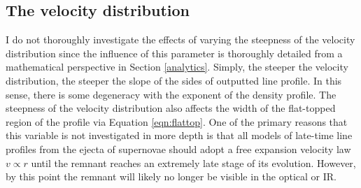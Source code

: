 %
%
%

\subsection{The velocity distribution}

\label{scn:vel_prof}

I do not thoroughly investigate the effects of varying the steepness of the velocity distribution since the influence of this parameter is thoroughly detailed from a mathematical perspective in Section \ref{analytics}.  Simply, the steeper the velocity distribution, the steeper the slope of the sides of outputted line profile.  In this sense, there is some degeneracy with the exponent of the density profile.  The steepness of the velocity distribution also affects the width of the flat-topped region of the profile via Equation \ref{eqn:flattop}.  One of the primary reasons that this variable is not investigated in more depth is that all models of late-time line profiles from the ejecta of supernovae should adopt a free expansion velocity law $v \propto r$ until the remnant reaches an extremely late stage of its evolution.  However, by this point the remnant will likely no longer be visible in the optical or IR.

